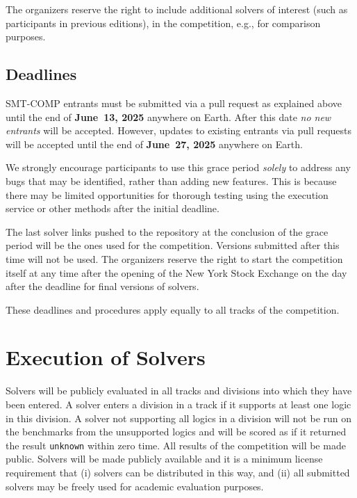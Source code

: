 \documentclass[12pt]{article}
\newcommand{\executionservice}{execution service\xspace}
\begin{document}
%
The organizers reserve the right to include additional solvers of interest (such as participants in previous editions),
in the competition, e.g., for comparison purposes.

%


\subsection*{Deadlines}

SMT-COMP entrants must be submitted via a pull request as explained above until the end of
{\bf June~13, 2025} anywhere on Earth.
After this date \emph{no new entrants} will be accepted.
However, updates to existing entrants via pull requests
will be accepted until the end of {\bf June~27, 2025} anywhere on Earth.

We strongly encourage participants to use this grace period
\emph{solely} to address any bugs that may be identified,
rather than adding new features. This is because there may be limited opportunities for
thorough testing using the \executionservice or other methods after the initial deadline.

The last solver links pushed to the repository at the conclusion of
the grace period will be the ones used for the competition.  Versions
submitted after this time will not be used.  The organizers reserve
the right to start the competition itself at any time after the opening
of the New York Stock Exchange on the day after the deadline for final versions of solvers.

These deadlines and procedures apply equally to all tracks of the
competition.



\section{Execution of Solvers}

Solvers will be publicly evaluated in all tracks and divisions into
which they have been entered.
%
A solver enters a division in a track if it supports at least one
logic in this division.
%
A solver not supporting all logics in a division will not be run on
the benchmarks from the unsupported logics and will be scored as if it
returned the result \texttt{unknown} within zero time.
%
All results of the competition will be made public. Solvers will be
made publicly available and it is a minimum
license requirement that (i) solvers can be distributed in this way,
and (ii) all submitted solvers may be freely used for academic
evaluation purposes.
\end{document}
